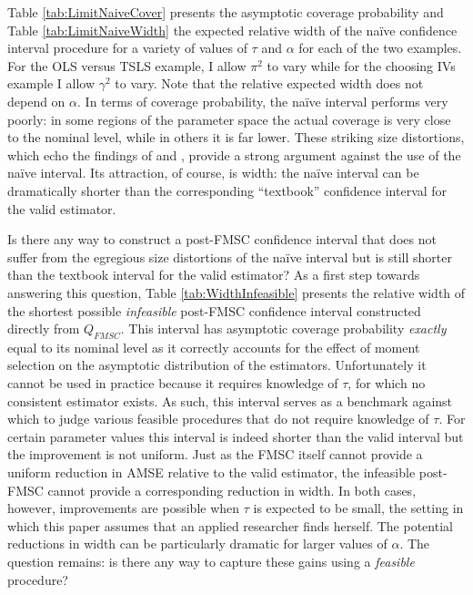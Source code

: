 Table \ref{tab:LimitNaiveCover} presents the asymptotic coverage probability and Table \ref{tab:LimitNaiveWidth} the expected relative width of the na\"{i}ve confidence interval procedure for a variety of values of $\tau$ and $\alpha$ for each of the two examples.
For the OLS versus TSLS example, I allow $\pi^2$ to vary while for the choosing IVs example I allow $\gamma^2$ to vary.
Note that the relative expected width does not depend on $\alpha$.
In terms of coverage probability, the na\"{i}ve interval performs very poorly: in some regions of the parameter space the actual coverage is very close to the nominal level, while in others it is far lower.
These striking size distortions, which echo the findings of \cite{Guggenberger2010} and \cite{Guggenberger2012}, provide a strong argument against the use of the na\"{i}ve interval.
Its attraction, of course, is width: the na\"{i}ve interval can be dramatically shorter than the corresponding ``textbook'' confidence interval for the valid estimator.


Is there any way to construct a post-FMSC confidence interval that does not suffer from the egregious size distortions of the na\"{i}ve interval but is still shorter than the textbook interval for the valid estimator?
As a first step towards answering this question, Table \ref{tab:WidthInfeasible} presents the relative width of the shortest possible \emph{infeasible} post-FMSC confidence interval constructed directly from $Q_{FMSC}$.
This interval has asymptotic coverage probability \emph{exactly} equal to its nominal level as it correctly accounts for the effect of moment selection on the asymptotic distribution of the estimators.
Unfortunately it cannot be used in practice because it requires knowledge of $\tau$, for which no consistent estimator exists.
As such, this interval serves as a benchmark against which to judge various feasible procedures that do not require knowledge of $\tau$.
For certain parameter values this interval is indeed shorter than the valid interval but the improvement is not uniform.
Just as the FMSC itself cannot provide a uniform reduction in AMSE relative to the valid estimator, the infeasible post-FMSC cannot provide a corresponding reduction in width.
In both cases, however, improvements are possible when $\tau$ is expected to be small, the setting in which this paper assumes that an applied researcher finds herself. 
The potential reductions in width can be particularly dramatic for larger values of $\alpha$.
The question remains: is there any way to capture these gains using a \emph{feasible} procedure?

